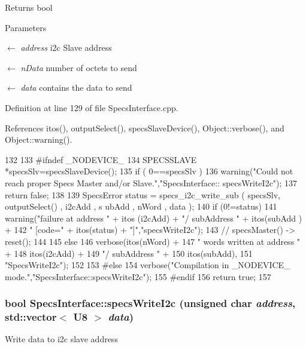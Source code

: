\begin{DoxyReturn}{Returns}
bool 
\end{DoxyReturn}

\begin{DoxyParams}{Parameters}
\item[\mbox{$\leftarrow$} {\em address}]i2c Slave address \item[\mbox{$\leftarrow$} {\em nData}]number of octets to send \item[\mbox{$\leftarrow$} {\em data}]contains the data to send \end{DoxyParams}


Definition at line 129 of file SpecsInterface.cpp.

References itos(), outputSelect(), specsSlaveDevice(), Object::verbose(), and Object::warning().


\begin{DoxyCode}
132                                             {
133 #ifndef _NODEVICE_
134   SPECSSLAVE *specsSlv=specsSlaveDevice();
135   if ( 0==specsSlv ){
136     warning("Could not reach proper Specs Master and/or Slave.","SpecsInterface::
      specsWriteI2c");
137     return false;
138   }
139   SpecsError status = specs_i2c_write_sub ( specsSlv, outputSelect() , i2cAdd , s
      ubAdd , nWord , data );
140   if (0!=status){
141     warning("failure at address " + itos (i2cAdd) + "/ subAddress " + itos(subAdd
      ) +
142             " [code=" + itos(status) + "]","specsWriteI2c");
143     //    specsMaster() -> reset();
144   }
145   else {
146     verbose(itos(nWord) + 
147             " words written at address " + 
148             itos(i2cAdd) + 
149             "/ subAddress " + 
150             itos(subAdd),
151             "SpecsWriteI2c");
152   }
153 #else
154   verbose("Compilation in _NODEVICE_ mode.","SpecsInterface::specsWriteI2c");
155 #endif
156   return true;
157 }
\end{DoxyCode}
\hypertarget{classSpecsInterface_a00c49357f1f60e3e50de9a51fa127b79}{
\subsubsection[{specsWriteI2c}]{\setlength{\rightskip}{0pt plus 5cm}bool SpecsInterface::specsWriteI2c (unsigned char {\em address}, \/  std::vector$<$ {\bf U8} $>$ {\em data})}}
\label{classSpecsInterface_a00c49357f1f60e3e50de9a51fa127b79}
Write data to i2c slave address

